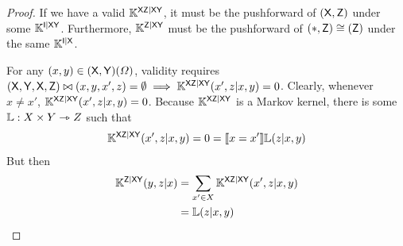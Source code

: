 \begin{proof}
If we have a valid $\mathbb{K}^{\mathsf{XZ}|\mathsf{XY}}$, it must be the pushforward of $(\mathsf{X},\mathsf{Z})$ under some $\mathbb{K}^{\mathsf{I}|\mathsf{XY}}$. Furthermore, $\mathbb{K}^{\mathsf{Z}|\mathsf{XY}}$ must be the pushforward of $(*,\mathsf{Z})\cong (\mathsf{Z})$ under the same $\mathbb{K}^{\mathsf{I}|\mathsf{X}}$.

For any $(x,y)\in (\mathsf{X},\mathsf{Y})(\Omega)$, validity requires $(\mathsf{X},\mathsf{Y},\mathsf{X},\mathsf{Z})\bowtie (x,y,x',z)=\emptyset \implies \mathbb{K}^{\mathsf{XZ}|\mathsf{XY}}(x',z|x,y)=0$. Clearly, whenever $x\neq x'$, $\mathbb{K}^{\mathsf{XZ}|\mathsf{XY}}(x',z|x,y)=0$. Because $\mathbb{K}^{\mathsf{XZ}|\mathsf{XY}}$ is a Markov kernel, there is some $\mathbb{L}:X\times Y\rightarrowtriangle Z$ such that
\begin{align}
 	\mathbb{K}^{\mathsf{XZ}|\mathsf{XY}}(x',z|x,y)=0 = \llbracket x=x' \rrbracket \mathbb{L}(z|x,y)\\
\end{align}
But then
\begin{align}
	\mathbb{K}^{\mathsf{Z}|\mathsf{XY}}(y,z|x) &= \sum_{x'\in X} \mathbb{K}^{\mathsf{XZ}|\mathsf{XY}}(x',z|x,y)\\
	&= \mathbb{L}(z|x,y)\\
\end{align}
\end{proof}







